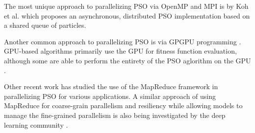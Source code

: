 The most unique approach to parallelizing PSO via OpenMP and MPI is by Koh et
al. \cite{papso} which proposes an asynchronous, distributed PSO implementation
based on a shared queue of particles. 

Another common approach to parallelizing PSO is via GPGPU programming
\cite{gpu-ppso, gpu-pso, biopsogpu}. GPU-based
algorithms primarily use the GPU for fitness function evaluation, although
some are able to perform the entirety of the PSO aglorithm on the GPU
\cite{swarmgrid, multiswarmpso-gpu}.

Other recent work \cite{mrcpso, mprso, coop-pso, intrusion-pso} has
studied the use of the MapReduce framework \cite{mapreduce} in parallelizing PSO
for various applications.
A similar approach of using
MapReduce for coarse-grain parallelism and resiliency while allowing
models to manage the fine-grained
parallelism is also being investigated by the deep learning community \cite{mrpnn,
  heterospark, dlspark}. 


